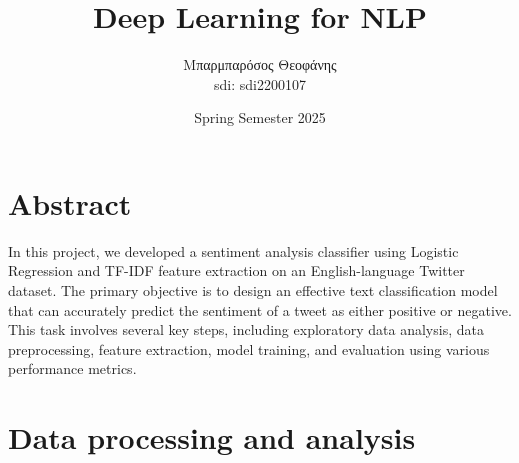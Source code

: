 \documentclass[12pt]{fphw}
\title{Deep Learning for NLP} %
\author{{Μπαρμπαρόσος Θεοφάνης} \\sdi: {sdi2200107}} %
\date{Spring Semester 2025} %
\institute{University of Athens \\ Department of Informatics and Telecommunications} %
\begin{document}
\maketitle %

{
  \hypersetup{linkcolor=black}
  \tableofcontents
}
\newpage

\section{Abstract}
In this project, we developed a sentiment analysis classifier using Logistic Regression and TF-IDF feature extraction on an English-language Twitter dataset. The primary objective is to design an effective text classification model that can accurately predict the sentiment of a tweet as either positive or negative. This task involves several key steps, including exploratory data analysis, data preprocessing, feature extraction, model training, and evaluation using various performance metrics.

\section{Data processing and analysis}
\end{document}
